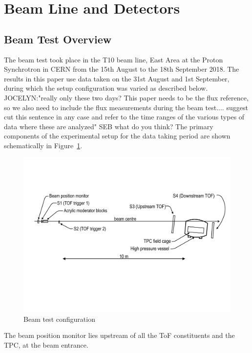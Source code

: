 \section{Beam Line and Detectors}
\label{hptpcPaper:sec:Methods}

    \subsection{Beam Test Overview}
    The beam test took place in the T10 beam line, East Area at the Proton Synchrotron in CERN from the 15th August to the 18th September 2018.
    The results in this paper use data taken on the 31st August and 1st September, during which the setup configuration was varied as described below.
    JOCELYN:"really only these two days?  This paper needs to be the flux reference, so we also need to include the flux measurements during the beam test....
suggest cut this sentence in any case and refer to the time ranges of the various types of data where these are analyzed" SEB what do you think?
    The primary components of the  experimental setup for the data taking period are shown schematically in Figure~\ref{fig:setup}.
    \begin{figure}
    \includegraphics[width=1.0\linewidth]{files/Figures/T10Diagram.pdf}
    	\caption{Beam test configuration}
    		\label{fig:setup}
    \end{figure}
    The beam position monitor lies upstream of all the ToF constituents and the TPC, at the beam entrance. 
